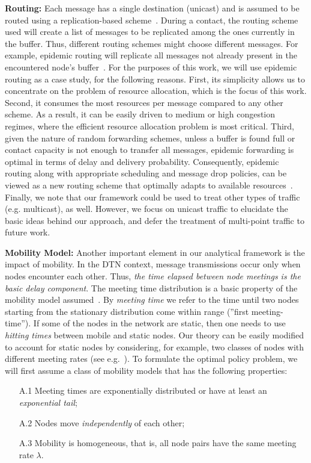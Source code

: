\textbf{Routing:} Each message has a single destination (unicast) and is assumed to be routed using a replication-based scheme~\cite{akis:ton-multi}. During a contact, the routing scheme used will create a list of messages to be replicated among the ones currently in the buffer. Thus, different routing schemes might choose different messages. For example, epidemic routing will replicate all messages not already present in the encountered node's buffer~\cite{Vahdat:epidemic}. For the purposes of this work, we will use epidemic routing as a case study, for the following reasons. First, its simplicity allows us to concentrate on the problem of resource allocation, which is the focus of this work. Second, it consumes the most resources per message compared to any other scheme. As a result, it can be easily driven to medium or high congestion regimes, where the efficient resource allocation problem is most critical. Third, given the nature of random forwarding schemes, unless a buffer is found full or contact capacity is not enough to transfer all messages, epidemic forwarding is optimal in terms of delay and delivery probability. Consequently, epidemic routing along with appropriate scheduling and message drop policies, can be viewed as a new routing scheme that optimally adapts to available resources~\cite{Levine:Sigcomm07}. Finally, we note that our framework could be used to treat other types of traffic (e.g. multicast), as well. However, we focus on unicast traffic to elucidate the basic ideas behind our approach, and defer the treatment of multi-point traffic to future work.

\textbf{Mobility Model:} Another important element in our analytical framework is the impact of mobility. In the DTN context, message transmissions occur only when nodes encounter each other. Thus, \emph{the time elapsed between node meetings is the basic delay component}. The meeting time distribution is a basic property of the mobility model assumed~\cite{akis:mobihoc06,Inria:MessageDelay}. By \emph{meeting time} we refer to the time until two nodes starting from the stationary distribution come within range (''first meeting-time''). If some of the nodes in the network are static, then one needs to use \emph{hitting times} between mobile and static nodes. Our theory can be easily modified to account for static nodes by considering, for example, two classes of nodes with different meeting rates (see e.g.~\cite{akis09}). To formulate the optimal policy problem, we will first assume a class of mobility models that has the following properties:
\begin{enumerate}
\item [A.1] Meeting times are exponentially distributed or have at least an \emph{exponential tail};
\item [A.2] Nodes move \emph{independently} of each other;
\item [A.3] Mobility is homogeneous, that is, all node pairs have the same meeting rate $\lambda$.
\end{enumerate}

